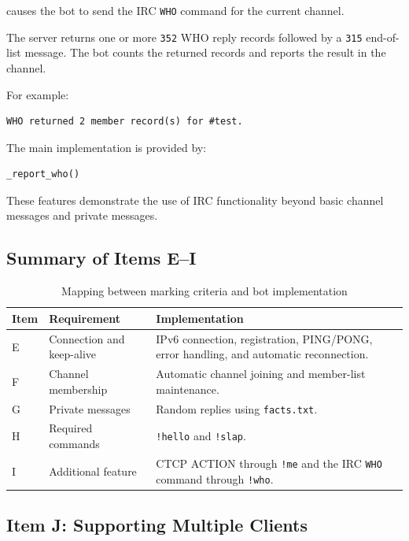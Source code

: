 \documentclass[a4paper,12pt]{article}
\begin{document}
causes the bot to send the IRC \texttt{WHO} command for the current channel.

The server returns one or more \texttt{352} WHO reply records followed by a \texttt{315} end-of-list message. The bot counts the returned records and reports the result in the channel.

For example:

\begin{verbatim}
WHO returned 2 member record(s) for #test.
\end{verbatim}

The main implementation is provided by:

\begin{lstlisting}[language=Python]
_report_who()
\end{lstlisting}

These features demonstrate the use of IRC functionality beyond basic channel messages and private messages.

\subsection{Summary of Items E--I}

\begin{table}[htbp]
\centering
\begin{tabular}{p{2cm}p{4cm}p{6cm}}
\toprule
Item & Requirement & Implementation \\
\midrule
E & Connection and keep-alive & IPv6 connection, registration, PING/PONG, error handling, and automatic reconnection. \\
F & Channel membership & Automatic channel joining and member-list maintenance. \\
G & Private messages & Random replies using \texttt{facts.txt}. \\
H & Required commands & \texttt{!hello} and \texttt{!slap}. \\
I & Additional feature & CTCP ACTION through \texttt{!me} and the IRC \texttt{WHO} command through \texttt{!who}. \\
\bottomrule
\end{tabular}
\caption{Mapping between marking criteria and bot implementation}
\end{table}

\subsection{Item J: Supporting Multiple Clients}
\end{document}
